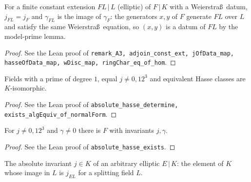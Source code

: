 \begin{remark}
\label{rem:A-3}
\leanok
For a finite constant extension $FL\,|\,L$ (elliptic) of $F\,|\,K$ with a Weierstra\ss\ datum, $j_{FL}=j_F$ and $\gamma_{FL}$ is the image of $\gamma_F$: the generators $x,y$ of $F$ generate $FL$ over $L$ and satisfy the same Weierstra\ss\ equation, so $(x,y)$ is a datum of $FL$ by the model-prime lemma.
\end{remark}
\begin{proof}
\leanok
See the Lean proof of \texttt{remark\_A3, adjoin\_const\_ext, jOfData\_map, hasseOfData\_map, wDisc\_map, ringChar\_eq\_of\_hom}.
\end{proof}

\begin{theorem}[Uniqueness of $F\,|\,K$]
\label{thm:A-uniqueness}
\leanok
Fields with a prime of degree $1$, equal $j\ne0,12^3$ and equivalent Hasse classes are $K$-isomorphic.
\end{theorem}
\begin{proof}
\leanok
See the Lean proof of \texttt{absolute\_hasse\_determine, exists\_algEquiv\_of\_normalForm}.
\end{proof}

\begin{theorem}
\label{thm:A-existence}
\leanok
For $j\ne 0,12^3$ and $\gamma\neq 0$ there is $F$ with invariants $j,\gamma$.
\end{theorem}
\begin{proof}
See the Lean proof of \texttt{absolute\_hasse\_exists}.
\end{proof}

\begin{definition}
\label{def:absolute-invariant-gen}
\leanok
The absolute invariant $j\in K$ of an arbitrary elliptic $E\,|\,K$: the element of $K$ whose image in $L$ is $j_{EL}$ for a splitting field $L$.
\end{definition}

